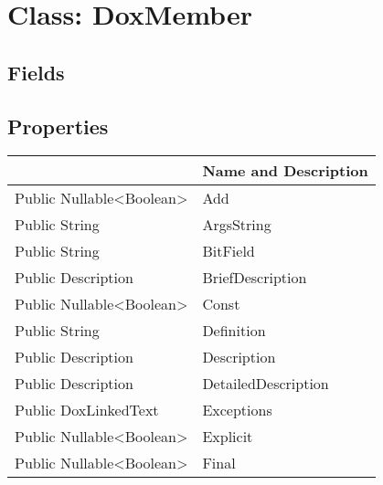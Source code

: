 \documentclass[11pt, oneside, a4paper]{book}
\begin{document}
\hypertarget{SoftwareEngineeringTools.{}Documentation.{}DoxMember}{}
\section{Class: DoxMember}

\subsection{Fields}

\subsection{Properties}
\begin{center}
\begin{tabular}{| p{3cm} | p{12cm} | }
\hline
\textbf{ } & \textbf{ Name and Description}\\
\hline
 Public  Nullable<Boolean> &  Add\hypertarget{SoftwareEngineeringTools.{}Documentation.{}DoxMember.{}Add}{}\\
\hline
 Public  String &  ArgsString\hypertarget{SoftwareEngineeringTools.{}Documentation.{}DoxMember.{}ArgsString}{}\\
\hline
 Public  String &  BitField\hypertarget{SoftwareEngineeringTools.{}Documentation.{}DoxMember.{}BitField}{}\\
\hline
 Public  Description &  BriefDescription\hypertarget{SoftwareEngineeringTools.{}Documentation.{}DoxMember.{}BriefDescription}{}\\
\hline
 Public  Nullable<Boolean> &  Const\hypertarget{SoftwareEngineeringTools.{}Documentation.{}DoxMember.{}Const}{}\\
\hline
 Public  String &  Definition\hypertarget{SoftwareEngineeringTools.{}Documentation.{}DoxMember.{}Definition}{}\\
\hline
 Public  Description &  Description\hypertarget{SoftwareEngineeringTools.{}Documentation.{}DoxMember.{}Description}{}\\
\hline
 Public  Description &  DetailedDescription\hypertarget{SoftwareEngineeringTools.{}Documentation.{}DoxMember.{}DetailedDescription}{}\\
\hline
 Public  DoxLinkedText &  Exceptions\hypertarget{SoftwareEngineeringTools.{}Documentation.{}DoxMember.{}Exceptions}{}\\
\hline
 Public  Nullable<Boolean> &  Explicit\hypertarget{SoftwareEngineeringTools.{}Documentation.{}DoxMember.{}Explicit}{}\\
\hline
 Public  Nullable<Boolean> &  Final\hypertarget{SoftwareEngineeringTools.{}Documentation.{}DoxMember.{}Final}{}\\

\end{tabular}
\end{center}
\end{document}

